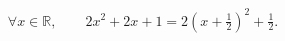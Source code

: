 \[
  \forall x \in \mathbb{R}, \qquad 2x^2 + 2x + 1
  = 2\left(x+\tfrac{1}{2}\right)^2 + \tfrac{1}{2}.
\]
